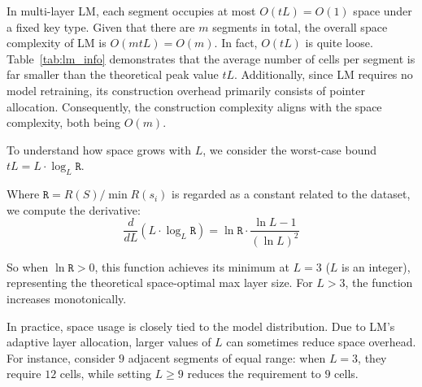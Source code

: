 In multi-layer LM, each segment occupies at most $O(t\mathit{L}) = O(1)$ space under a fixed key type. Given that there are $m$ segments in total, the overall space complexity of LM is $O(mt\mathit{L}) = O(m)$. In fact, $O(t\mathit{L})$ is quite loose. Table~\ref{tab:lm_info} demonstrates that the average number of cells per segment is far smaller than the theoretical peak value $t\mathit{L}$. Additionally, since LM requires no model retraining, its construction overhead primarily consists of pointer allocation. Consequently, the construction complexity aligns with the space complexity, both being $O(m)$.

To understand how space grows with $\mathit{L}$, we consider the worst-case bound $t\mathit{L} = \mathit{L} \cdot \log_\mathit{L}\mathtt{R}$.

Where $\mathtt{R} = R(S) / \min R(s_{i})$ is regarded as a constant related to the dataset, we compute the derivative:
$$
\frac{d}{d\mathit{L}} \left(\mathit{L} \cdot \log_\mathit{L} \mathtt{R}\right) = \ln \mathtt{R} \cdot \frac{\ln \mathit{L} - 1}{(\ln \mathit{L})^2}
$$

So when $\ln \mathtt{R} > 0$, this function achieves its minimum at $\mathit{L} = 3$ ($\mathit{L}$ is an integer), representing the theoretical space-optimal max layer size. For $\mathit{L} > 3$, the function increases monotonically. 


In practice, space usage is closely tied to the model distribution. Due to LM’s adaptive layer allocation, larger values of $\mathit{L}$ can sometimes reduce space overhead. For instance, consider $9$ adjacent segments of equal range: when $\mathit{L} = 3$, they require $12$ cells, while setting $\mathit{L} \ge 9$ reduces the requirement to $9$ cells.



